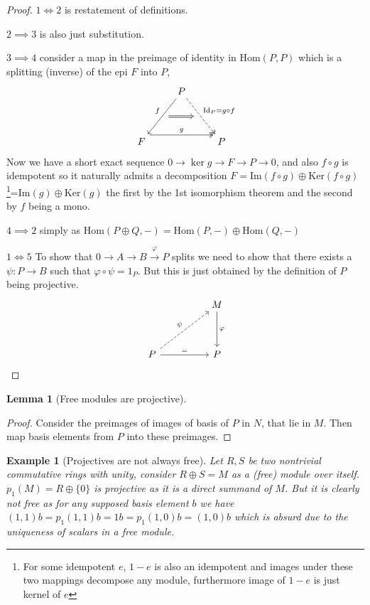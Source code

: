 \documentclass[12pt]{article}
\numberwithin{equation}{section}
\newcommand{\Hom}{{\mathrm{Hom}}}
\newcommand{\image}{{\mathrm{Im}}}
\newcommand{\kernel}{{\mathrm{Ker}}}
\newcounter{dummy} \numberwithin{dummy}{section}
\newtheorem{lemma}[dummy]{Lemma}
\newtheorem{example}[dummy]{Example}
\begin{document}
	\begin{proof}
		$1 \iff 2$ is restatement of definitions.
		
		$2 \implies 3$ is also just substitution.
		
		$3 \implies 4$ consider a map in the preimage of identity in $\Hom(P,P)$ which is a splitting (inverse) of the epi $F$ into $P$,
		\[\begin{tikzcd}
			& P \\
			\\
			F && P
			\arrow["g", shift left=3, two heads, from=3-1, to=3-3]
			\arrow[""{name=0, anchor=center, inner sep=0}, "f"', from=1-2, to=3-1]
			\arrow[""{name=1, anchor=center, inner sep=0}, "{\mathrm{Id}_P=g \circ f}", dashed, two heads, from=1-2, to=3-3]
			\arrow[shorten <=6pt, shorten >=6pt, Rightarrow, from=0, to=1]
		\end{tikzcd}\]
		Now we have a short exact sequence $0 \to \ker g \to F \to P \to 0$, and also $f\circ g $ is idempotent so it naturally admits a decomposition $F = \image(f \circ g) \oplus \kernel (f \circ g)$\footnote{For some idempotent $e$, $1-e$ is also an idempotent and images under these two mappings decompose any module, furthermore image of $1-e$ is just kernel of $e$}=$\image (g) \oplus \kernel (g)$ the first by the 1st isomorphism theorem and the second by $f $ being a mono.
		
		$4 \implies 2$ simply as $\Hom (P \oplus Q,-) = \Hom(P,-) \oplus \Hom(Q,-)$
		
		$1 \iff 5$ To show that $0\to A \to B \xrightarrow{\varphi} P$ splits we need to show that there exists a $\psi: P \to B$ such that $\varphi \circ \psi = 1_P$. But this is just obtained by the definition of $P$ being projective.
		\[\begin{tikzcd}
			&& M \\
			\\
			P && P
			\arrow["\varphi", from=1-3, to=3-3]
			\arrow["\psi", dashed, from=3-1, to=1-3]
			\arrow["{=}", from=3-1, to=3-3]
		\end{tikzcd}\]
		
	\end{proof}
	\begin{lemma}[Free modules are projective]
	\end{lemma}
	\begin{proof}
		Consider the preimages of images of basis of $P$ in $N$, that lie in $M$. Then map basis elements from $P$ into these preimages.
	\end{proof}
	\begin{example}[Projectives are not always free]
		Let $R,S $ be two nontrivial commutative rings with unity, consider $R \oplus S = M$ as a (free) module over itself. $p_1(M)=R \oplus \{0\}$ is projective as it is a direct summand of $M$. But it is clearly not free as for any supposed basis element $b$ we have $(1,1) b = p_1 (1,1) b=1b=p_1(1,0) b=(1,0)b$ which is absurd due to the uniqueness of scalars in a free module.
	\end{example}
	
\end{document}
